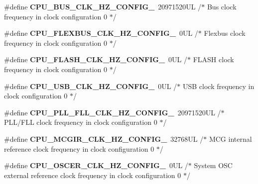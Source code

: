 \begin{DoxyCompactItemize}
\item 
\mbox{\label{group___cpu__module_gaf060a047649b9537eb77354ab7917a8b}} 
\#define {\bfseries C\+P\+U\+\_\+\+B\+U\+S\+\_\+\+C\+L\+K\+\_\+\+H\+Z\+\_\+\+C\+O\+N\+F\+I\+G\+\_}~20971520\+U\+L /$\ast$ Bus clock frequency in clock configuration 0 $\ast$/
\item 
\mbox{\label{group___cpu__module_ga706c0d4dd14c93181b7a99badddc9a51}} 
\#define {\bfseries C\+P\+U\+\_\+\+F\+L\+E\+X\+B\+U\+S\+\_\+\+C\+L\+K\+\_\+\+H\+Z\+\_\+\+C\+O\+N\+F\+I\+G\+\_}~0\+U\+L /$\ast$ Flexbus clock frequency in clock configuration 0 $\ast$/
\item 
\mbox{\label{group___cpu__module_ga09c9820f38d931a0400b832d2582c6f7}} 
\#define {\bfseries C\+P\+U\+\_\+\+F\+L\+A\+S\+H\+\_\+\+C\+L\+K\+\_\+\+H\+Z\+\_\+\+C\+O\+N\+F\+I\+G\+\_}~0\+U\+L /$\ast$ F\+L\+A\+S\+H clock frequency in clock configuration 0 $\ast$/
\item 
\mbox{\label{group___cpu__module_ga7bf843fdf59af5fcaf48bea898884a3e}} 
\#define {\bfseries C\+P\+U\+\_\+\+U\+S\+B\+\_\+\+C\+L\+K\+\_\+\+H\+Z\+\_\+\+C\+O\+N\+F\+I\+G\+\_}~0\+U\+L /$\ast$ U\+S\+B clock frequency in clock configuration 0 $\ast$/
\item 
\mbox{\label{group___cpu__module_gad2aaa2918b640ae3833fc84e8f983c3c}} 
\#define {\bfseries C\+P\+U\+\_\+\+P\+L\+L\+\_\+\+F\+L\+L\+\_\+\+C\+L\+K\+\_\+\+H\+Z\+\_\+\+C\+O\+N\+F\+I\+G\+\_}~20971520\+U\+L /$\ast$ P\+L\+L/\+F\+L\+L clock frequency in clock configuration 0 $\ast$/
\item 
\mbox{\label{group___cpu__module_ga860e7441eac7d5e35385bcd62b019d9d}} 
\#define {\bfseries C\+P\+U\+\_\+\+M\+C\+G\+I\+R\+\_\+\+C\+L\+K\+\_\+\+H\+Z\+\_\+\+C\+O\+N\+F\+I\+G\+\_}~32768\+U\+L /$\ast$ M\+C\+G internal reference clock frequency in clock configuration 0 $\ast$/
\item 
\mbox{\label{group___cpu__module_ga2960ebfe6475f475999ea8f1d5448483}} 
\#define {\bfseries C\+P\+U\+\_\+\+O\+S\+C\+E\+R\+\_\+\+C\+L\+K\+\_\+\+H\+Z\+\_\+\+C\+O\+N\+F\+I\+G\+\_}~0\+U\+L /$\ast$ System O\+S\+C external reference clock frequency in clock configuration 0 $\ast$/

\end{DoxyCompactItemize}
